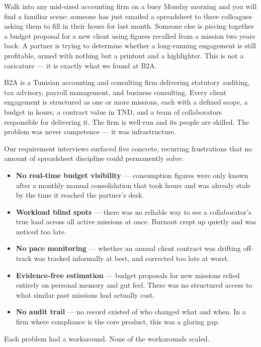 \documentclass[12pt,a4paper]{report}
\begin{document}
Walk into any mid-sized accounting firm on a busy Monday morning and you will find a
familiar scene: someone has just emailed a spreadsheet to three colleagues asking them
to fill in their hours for last month. Someone else is piecing together a budget
proposal for a new client using figures recalled from a mission two years back. A
partner is trying to determine whether a long-running engagement is still profitable,
armed with nothing but a printout and a highlighter. This is not a caricature --- it
is exactly what we found at B2A.

B2A is a Tunisian accounting and consulting firm delivering statutory auditing, tax
advisory, payroll management, and business consulting. Every client engagement is
structured as one or more missions, each with a defined scope, a budget in hours, a
contract value in TND, and a team of collaborators responsible for delivering it.
The firm is well-run and its people are skilled. The problem was never competence
--- it was infrastructure.

Our requirement interviews surfaced five concrete, recurring frustrations that no
amount of spreadsheet discipline could permanently solve:

\begin{itemize}
  \item \textbf{No real-time budget visibility} --- consumption figures were only
        known after a monthly manual consolidation that took hours and was already
        stale by the time it reached the partner's desk.
  \item \textbf{Workload blind spots} --- there was no reliable way to see a
        collaborator's true load across all active missions at once. Burnout crept
        up quietly and was noticed too late.
  \item \textbf{No pace monitoring} --- whether an annual client contract was
        drifting off-track was tracked informally at best, and corrected too late
        at worst.
  \item \textbf{Evidence-free estimation} --- budget proposals for new missions
        relied entirely on personal memory and gut feel. There was no structured
        access to what similar past missions had actually cost.
  \item \textbf{No audit trail} --- no record existed of who changed what and when.
        In a firm where compliance is the core product, this was a glaring gap.
\end{itemize}

Each problem had a workaround. None of the workarounds scaled.
\end{document}
